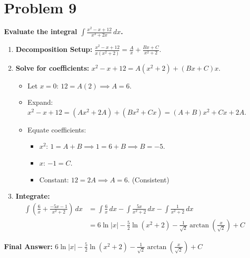 \documentclass{article}
\begin{document}
\section{Problem 9}
\textbf{Evaluate the integral $\displaystyle\int \frac{x^2-x+12}{x^3+2x} \,dx$.}
\begin{enumerate}
    \item \textbf{Decomposition Setup:} $\displaystyle\frac{x^2-x+12}{x(x^2+2)} = \frac{A}{x} + \frac{Bx+C}{x^2+2}$.
    \item \textbf{Solve for coefficients:} $x^2-x+12 = A(x^2+2) + (Bx+C)x$.
    \begin{itemize}
        \item Let $x=0$: $12 = A(2) \implies A=6$.
        \item Expand: $x^2-x+12 = (Ax^2+2A) + (Bx^2+Cx) = (A+B)x^2 + Cx + 2A$.
        \item Equate coefficients:
        \begin{itemize}
            \item $x^2$: $1 = A+B \implies 1 = 6+B \implies B=-5$.
            \item $x$: $-1 = C$.
            \item Constant: $12=2A \implies A=6$. (Consistent)
        \end{itemize}
    \end{itemize}
    \item \textbf{Integrate:}
    \begin{align*}
    \int \left( \frac{6}{x} + \frac{-5x-1}{x^2+2} \right) \,dx &= \int \frac{6}{x} \,dx - \int \frac{5x}{x^2+2} \,dx - \int \frac{1}{x^2+2} \,dx \\
    &= 6\ln|x| - \frac{5}{2}\ln(x^2+2) - \frac{1}{\sqrt{2}}\arctan\left(\frac{x}{\sqrt{2}}\right) + C
    \end{align*}
\end{enumerate}
\textbf{Final Answer:} $\displaystyle 6\ln|x| - \frac{5}{2}\ln(x^2+2) - \frac{1}{\sqrt{2}}\arctan\left(\frac{x}{\sqrt{2}}\right) + C$
\end{document}
